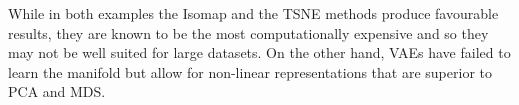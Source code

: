 \documentclass[12pt]{article}
\begin{document}
While in both examples the Isomap and the TSNE methods produce favourable results, they are known to be the most computationally expensive and so they may not be well suited for large datasets. On the other hand, VAEs have failed to learn the manifold but allow for non-linear representations that are superior to PCA and MDS. 
\newpage














\end{document}
